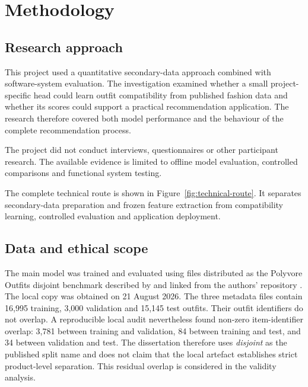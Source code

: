 \chapter{Methodology}

\section{Research approach}

This project used a quantitative secondary-data approach combined with
software-system evaluation. The investigation examined whether a small
project-specific head could learn outfit compatibility from published fashion data and whether
its scores could support a practical recommendation application. The research
therefore covered both model performance and the behaviour of the complete
recommendation process.

The project did not conduct interviews, questionnaires or other participant
research. The available evidence is limited to offline model evaluation,
controlled comparisons and functional system testing.

The complete technical route is shown in Figure~\ref{fig:technical-route}.
It separates secondary-data preparation and frozen feature extraction from
compatibility learning, controlled evaluation and application deployment.



\section{Data and ethical scope}

The main model was trained and evaluated using files distributed as the
Polyvore Outfits disjoint benchmark described by
\textcite{vasileva2018typeaware} and linked from the authors' repository
\parencite{vasileva2018repository}. The local copy was obtained on 21 August
2026. The three metadata files contain 16,995 training, 3,000 validation and
15,145 test outfits. Their outfit identifiers do not overlap. A reproducible
local audit nevertheless found non-zero item-identifier overlap: 3,781 between
training and validation, 84 between training and test, and 34 between
validation and test. The dissertation therefore uses \emph{disjoint} as the
published split name and does not claim that the local artefact establishes
strict product-level separation. This residual overlap is considered in the
validity analysis.

